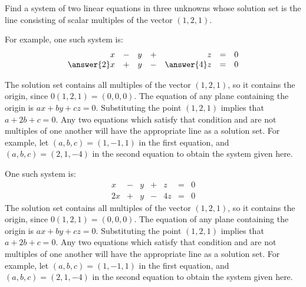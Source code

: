 \documentclass{ximera}
\begin{document}
\begin{exercise} \label{c2.2.8}
Find a system of two linear equations in three
unknowns whose solution set is the line consisting of scalar
multiples of the vector $(1,2,1)$.

\begin{prompt}
  For example, one such system is:
\[
\begin{array}{rrrrrrr}
x & - & y & + & z & = & 0 \\
\answer{2}x & + & y & - & \answer{4}z & = & 0\end{array}
\]
\end{prompt}
\begin{hint}
  The solution set contains all multiples of the vector $(1,2,1)$,
so it contains the origin, since $0(1,2,1) = (0,0,0)$.  The equation
of any plane containing the origin is $ax + by + cz = 0$. 
Substituting the point $(1,2,1)$ implies that $a + 2b + c = 0$. 
Any two equations which satisfy that condition and are not multiples
of one another will have the appropriate line as a solution set. 
For example, let $(a,b,c) = (1,-1,1)$ in the first equation, and
$(a,b,c) = (2,1,-4)$ in the second equation to obtain the system
given here.
\end{hint}

\begin{solution}

\ans One such system is:
\[
\begin{array}{rrrrrrr}
x & - & y & + & z & = & 0 \\
2x & + & y & - & 4z & = & 0\end{array}
\]
\soln The solution set contains all multiples of the vector $(1,2,1)$,
so it contains the origin, since $0(1,2,1) = (0,0,0)$.  The equation
of any plane containing the origin is $ax + by + cz = 0$. 
Substituting the point $(1,2,1)$ implies that $a + 2b + c = 0$. 
Any two equations which satisfy that condition and are not multiples
of one another will have the appropriate line as a solution set. 
For example, let $(a,b,c) = (1,-1,1)$ in the first equation, and
$(a,b,c) = (2,1,-4)$ in the second equation to obtain the system
given here.



\end{solution}
\end{exercise}
\end{document}

